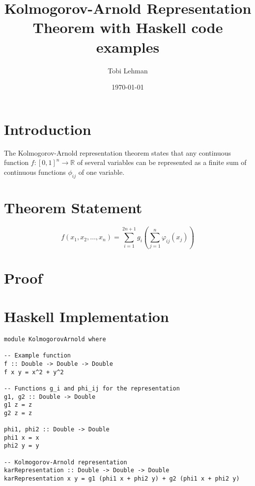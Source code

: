 \documentclass[11pt]{article}
\author{Tobi Lehman}
\date{\today}
\title{Kolmogorov-Arnold Representation Theorem with Haskell code examples}
\begin{document}
\maketitle
\tableofcontents


\section{Introduction}
\label{sec:org6c4be2c}
The Kolmogorov-Arnold representation theorem states that any continuous function \(f:[0,1]^n \to \mathbb{R}\) of several variables can be represented as a finite sum of continuous functions \(\phi_{ij}\) of one variable.

\section{Theorem Statement}
\label{sec:org82dd4e8}

$$ f(x_1, x_2, \ldots, x_n) = \sum_{i=1}^{2n+1} g_i \left( \sum_{j=1}^{n} \varphi_{ij}(x_j) \right)$$

\section{Proof}
\label{sec:org1d43ae2}


\section{Haskell Implementation}
\label{sec:org5fe754d}

\begin{verbatim}
module KolmogorovArnold where

-- Example function
f :: Double -> Double -> Double
f x y = x^2 + y^2

-- Functions g_i and phi_ij for the representation
g1, g2 :: Double -> Double
g1 z = z
g2 z = z

phi1, phi2 :: Double -> Double
phi1 x = x
phi2 y = y

-- Kolmogorov-Arnold representation
karRepresentation :: Double -> Double -> Double
karRepresentation x y = g1 (phi1 x + phi2 y) + g2 (phi1 x + phi2 y)
\end{verbatim}
\end{document}

